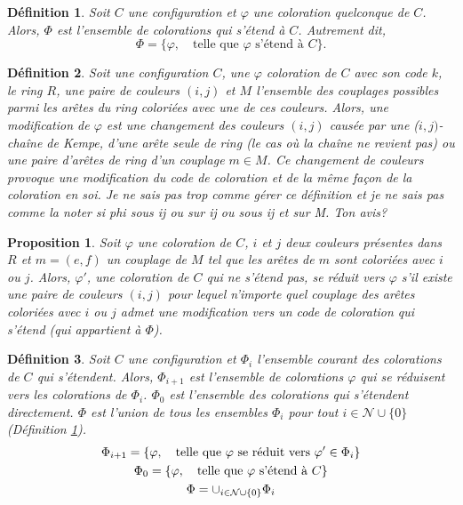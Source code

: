 \documentclass[10pt,a4paper]{article}
\newtheorem{definition}{Définition}
\newtheorem{proposition}{Proposition}
\begin{document}
\begin{definition}
Soit $C$ une configuration et $\varphi$ une coloration quelconque de $C$. Alors, $\Phi$ est l'ensemble de colorations qui s'étend à $C$. Autrement dit,
$$
\Phi = \{ \varphi, \quad \textrm{telle que $\varphi$ s'étend à $C$} \}.
$$
\label{de:phi}
\end{definition}

\begin{definition}
Soit une configuration $C$, une $\varphi$ coloration de $C$ avec son code $k$, le ring $R$, une paire de couleurs $(i,j)$ et $M$ l'ensemble des couplages possibles parmi les arêtes du ring coloriées avec une de ces couleurs. Alors, une \emph{modification} de $\varphi$ est une changement des couleurs $(i,j)$ causée par une ($i,j)$-chaîne de Kempe, d'une arête seule de ring (le cas où la chaîne ne revient pas) ou une paire d'arêtes de ring  d'un couplage $m \in M$. Ce changement de couleurs provoque une modification du code de coloration et de la même façon de la coloration en soi.
{\color{red} Je ne sais pas trop comme gérer ce définition et je ne sais pas comme la noter si phi sous ij ou sur ij ou sous ij et sur M. Ton avis?}
\label{de:modif}
\end{definition}

\begin{proposition}
Soit $\varphi$ une coloration de $C$, $i$ et $j$ deux couleurs présentes dans $R$ et $m = (e,f)$ un couplage de $M$ tel que les arêtes de $m$ sont coloriées avec $i$ ou $j$. Alors, $\varphi'$, une coloration de $C$ qui ne s'étend pas, \emph{se réduit} vers  $\varphi$ s'il existe une paire de couleurs $(i,j)$ pour lequel n'importe quel couplage des arêtes coloriées avec $i$ ou $j$ admet une modification vers un code de coloration qui s'étend (qui appartient à $\Phi$).
\label{pro:phii}
\end{proposition}

\begin{definition}
Soit $C$ une configuration et $\Phi_i$ l'ensemble courant des colorations de $C$ qui s'étendent. Alors, $\Phi_{i+1}$ est l'ensemble de colorations $\varphi$ qui se réduisent vers les colorations de $\Phi_i$. $\Phi_0$ est l'ensemble des colorations qui s'étendent directement. $\Phi$ est l'union de tous les ensembles $\Phi_i$ pour tout $i \in \mathcal{N} \cup \{ 0\}$ (Définition \ref{de:phi}). 
$$
\gathered
\Phi_{i+1} = \{ \varphi, \quad \textrm{telle que $\varphi$ se réduit vers $\varphi' \in \Phi_i$} \}\\
\Phi_0 = \{\varphi, \quad \textrm{telle que $\varphi$ s'étend à $C$} \}\\
\Phi = \cup_{i \in \mathcal{N}\cup \{0 \}} \Phi_i 
\endgathered
$$
\end{definition}
\end{document}
